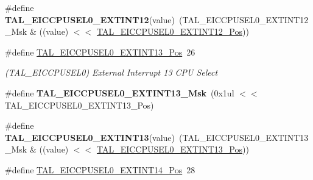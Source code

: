 \begin{DoxyCompactItemize}
\item 
\hypertarget{group___s_a_m_l21___t_a_l_gab8fe4f210be0b85bf36ee8b771d70d05}{}\#define {\bfseries T\+A\+L\+\_\+\+E\+I\+C\+C\+P\+U\+S\+E\+L0\+\_\+\+E\+X\+T\+I\+N\+T12}(value)~(T\+A\+L\+\_\+\+E\+I\+C\+C\+P\+U\+S\+E\+L0\+\_\+\+E\+X\+T\+I\+N\+T12\+\_\+\+Msk \& ((value) $<$$<$ \hyperlink{group___s_a_m_l21___t_a_l_ga130a06cbbd3d3dcb5a643f0e5b0a8246}{T\+A\+L\+\_\+\+E\+I\+C\+C\+P\+U\+S\+E\+L0\+\_\+\+E\+X\+T\+I\+N\+T12\+\_\+\+Pos}))\label{group___s_a_m_l21___t_a_l_gab8fe4f210be0b85bf36ee8b771d70d05}

\item 
\hypertarget{group___s_a_m_l21___t_a_l_ga53b60896a615729ef8ceb0dc476bd8b2}{}\#define \hyperlink{group___s_a_m_l21___t_a_l_ga53b60896a615729ef8ceb0dc476bd8b2}{T\+A\+L\+\_\+\+E\+I\+C\+C\+P\+U\+S\+E\+L0\+\_\+\+E\+X\+T\+I\+N\+T13\+\_\+\+Pos}~26\label{group___s_a_m_l21___t_a_l_ga53b60896a615729ef8ceb0dc476bd8b2}

\begin{DoxyCompactList}\small\item\em (T\+A\+L\+\_\+\+E\+I\+C\+C\+P\+U\+S\+E\+L0) External Interrupt 13 C\+P\+U Select \end{DoxyCompactList}\item 
\hypertarget{group___s_a_m_l21___t_a_l_ga9efb65f05691704541d29caa7ea4a907}{}\#define {\bfseries T\+A\+L\+\_\+\+E\+I\+C\+C\+P\+U\+S\+E\+L0\+\_\+\+E\+X\+T\+I\+N\+T13\+\_\+\+Msk}~(0x1ul $<$$<$ T\+A\+L\+\_\+\+E\+I\+C\+C\+P\+U\+S\+E\+L0\+\_\+\+E\+X\+T\+I\+N\+T13\+\_\+\+Pos)\label{group___s_a_m_l21___t_a_l_ga9efb65f05691704541d29caa7ea4a907}

\item 
\hypertarget{group___s_a_m_l21___t_a_l_ga7c71ef573b53a7c4f82a2191aa5750ff}{}\#define {\bfseries T\+A\+L\+\_\+\+E\+I\+C\+C\+P\+U\+S\+E\+L0\+\_\+\+E\+X\+T\+I\+N\+T13}(value)~(T\+A\+L\+\_\+\+E\+I\+C\+C\+P\+U\+S\+E\+L0\+\_\+\+E\+X\+T\+I\+N\+T13\+\_\+\+Msk \& ((value) $<$$<$ \hyperlink{group___s_a_m_l21___t_a_l_ga53b60896a615729ef8ceb0dc476bd8b2}{T\+A\+L\+\_\+\+E\+I\+C\+C\+P\+U\+S\+E\+L0\+\_\+\+E\+X\+T\+I\+N\+T13\+\_\+\+Pos}))\label{group___s_a_m_l21___t_a_l_ga7c71ef573b53a7c4f82a2191aa5750ff}

\item 
\hypertarget{group___s_a_m_l21___t_a_l_gae4b56fc4930d13ba261e990990dda9e4}{}\#define \hyperlink{group___s_a_m_l21___t_a_l_gae4b56fc4930d13ba261e990990dda9e4}{T\+A\+L\+\_\+\+E\+I\+C\+C\+P\+U\+S\+E\+L0\+\_\+\+E\+X\+T\+I\+N\+T14\+\_\+\+Pos}~28\label{group___s_a_m_l21___t_a_l_gae4b56fc4930d13ba261e990990dda9e4}


\end{DoxyCompactItemize}
